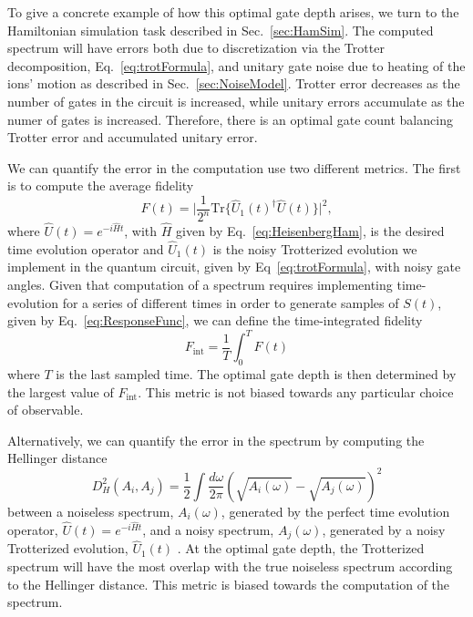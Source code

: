 \documentclass[prx,aps,twocolumn,showpacs,superscriptaddress,10pt]{revtex4-1}
\begin{document}
To give a concrete example of how this optimal gate depth arises, we turn to the Hamiltonian simulation task described in Sec.~\ref{sec:HamSim}. The computed spectrum will have errors both due to discretization via the Trotter decomposition, Eq.~\eqref{eq:trotFormula}, and unitary gate noise due to heating of the ions' motion as described in Sec.~\ref{sec:NoiseModel}. Trotter error decreases as the number of gates in the circuit is increased, while unitary errors accumulate as the numer of gates is increased. Therefore, there is an optimal gate count balancing Trotter error and accumulated unitary error. 

We can quantify the error in the computation use two different metrics. The first is to compute the average fidelity
\begin{equation}\label{eq:totFidelity}
F\left(t\right)=\lvert\frac{1}{2^{n}}\textrm{Tr}\{\hat{U}_{1}\left(t\right)^{\dagger}\hat{U}\left(t\right)\}\rvert^2,
\end{equation}
where $\hat{U}\left(t\right)=e^{-i\hat{H}t}$, with $\hat{H}$ given by Eq.~\eqref{eq:HeisenbergHam}, is the desired time evolution operator and $\hat{U}_{1}\left(t\right)$ is the noisy Trotterized evolution we implement in the quantum circuit, given by Eq~\eqref{eq:trotFormula}, with noisy gate angles. Given that computation of a spectrum requires implementing time-evolution for a series of different times in order to generate samples of $S(t)$, given by Eq.~\eqref{eq:ResponseFunc}, we can define the time-integrated fidelity
\begin{equation}\label{eq:intFidelity}
	F_\textrm{int} = \frac{1}{T}\int_{0}^{T}F\left(t\right)
\end{equation} 
where $T$ is the last sampled time. The optimal gate depth is then determined by the largest value of $F_\textrm{int}$. This metric is not biased towards any particular choice of observable.

Alternatively, we can quantify the error in the spectrum by computing the Hellinger distance
\begin{equation}\label{eq:HellingerDist}
D_{H}^{2}\left(A_{i},A_{j}\right)=\frac{1}{2}\int\frac{d\omega}{2\pi}\left(\sqrt{A_{i}(\omega)}-\sqrt{A_{j}(\omega)}\right)^{2}
\end{equation}
between a noiseless spectrum, $A_{i}(\omega)$, generated by the perfect time evolution operator, $\hat{U}\left(t\right)=e^{-i\hat{H}t}$, and a noisy spectrum, $A_{j}(\omega)$, generated by a noisy Trotterized evolution, $\hat{U}_{1}\left(t\right)$ . At the optimal gate depth, the Trotterized spectrum will have the most overlap with the true noiseless spectrum according to the Hellinger distance. This metric is biased towards the computation of the spectrum.
\end{document}
